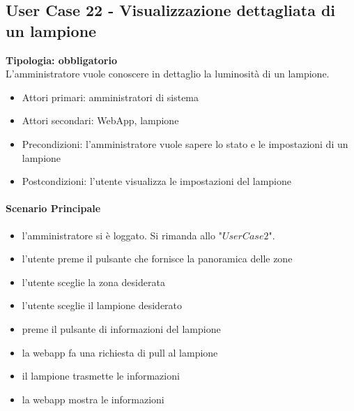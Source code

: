\documentclass[12pt]{article}
\begin{document}
\subsection{User Case 22 - Visualizzazione dettagliata di un lampione}
\textbf{Tipologia: obbligatorio} \\
L'amministratore vuole conoscere in dettaglio la luminosità di un lampione.
\begin{itemize}
	\item Attori primari: amministratori di sistema
	\item Attori secondari: WebApp, lampione
	\item Precondizioni: l'amministratore vuole sapere lo stato e le impostazioni di un lampione
	\item Postcondizioni: l'utente visualizza le impostazioni del lampione
\end{itemize}
\paragraph{Scenario Principale}
\begin{itemize}
	\item l'amministratore si è loggato. Si rimanda allo "$User Case 2$".
	\item l'utente preme il pulsante che fornisce la panoramica delle zone
	\item l'utente sceglie la zona desiderata
	\item l'utente sceglie il lampione desiderato
	\item preme il pulsante di informazioni del lampione
	\item la webapp fa una richiesta di pull al lampione
	\item il lampione trasmette le informazioni
	\item la webapp mostra le informazioni
\end{itemize}
\end{document}
